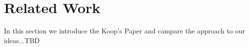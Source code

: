 \section{Related Work} 
In this section we introduce the Koop's Paper and campare the approach to our ideas...TBD